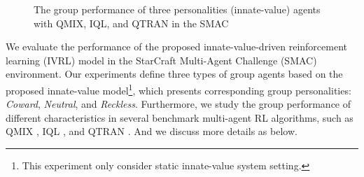 \documentclass[letterpaper]{article} %
\begin{document}
\begin{figure}[hptb]
\centering
{}
\caption{The group performance of three personalities (innate-value) agents with QMIX, IQL, and QTRAN in the SMAC}
\label{results}
\end{figure}

We evaluate the performance of the proposed innate-value-driven reinforcement learning (IVRL) model in the StarCraft Multi-Agent Challenge (SMAC) \cite{samvelyan19smac} environment. Our experiments define three types of group agents based on the proposed innate-value model\footnote{This experiment only consider static innate-value system setting.}, which presents corresponding group personalities: \textit{Coward}, \textit{Neutral}, and \textit{Reckless}. 
Furthermore, we study the group performance of different characteristics in several benchmark multi-agent RL algorithms, such as QMIX \cite{rashid2020monotonic}, IQL \cite{tampuu2017multiagent}, and QTRAN \cite{son2019qtran}. And we discuss more details as below.
\end{document}
